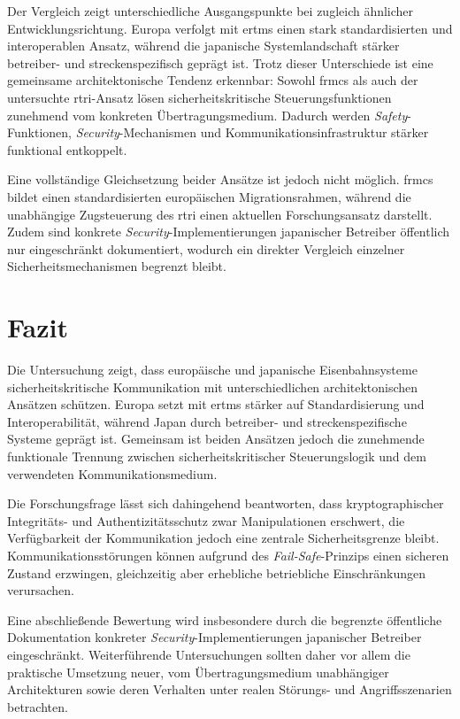 \documentclass[runningheads]{res/llncs}
\begin{document}
Der Vergleich zeigt unterschiedliche Ausgangspunkte bei zugleich ähnlicher Entwicklungsrichtung. Europa verfolgt mit \gls{ertms} einen stark standardisierten und interoperablen Ansatz, während die japanische Systemlandschaft stärker betreiber- und streckenspezifisch geprägt ist. Trotz dieser Unterschiede ist eine gemeinsame architektonische Tendenz erkennbar: Sowohl \gls{frmcs} als auch der untersuchte \gls{rtri}-Ansatz lösen sicherheitskritische Steuerungsfunktionen zunehmend vom konkreten Übertragungsmedium. Dadurch werden \textit{Safety}-Funktionen, \textit{Security}-Mechanismen und Kommunikationsinfrastruktur stärker funktional entkoppelt.

Eine vollständige Gleichsetzung beider Ansätze ist jedoch nicht möglich. \gls{frmcs} bildet einen standardisierten europäischen Migrationsrahmen, während die unabhängige Zugsteuerung des \gls{rtri} einen aktuellen Forschungsansatz darstellt. Zudem sind konkrete \textit{Security}-Implementierungen japanischer Betreiber öffentlich nur eingeschränkt dokumentiert, wodurch ein direkter Vergleich einzelner Sicherheitsmechanismen begrenzt bleibt.

\section{Fazit}
\label{sec:Fazit}

Die Untersuchung zeigt, dass europäische und japanische Eisenbahnsysteme sicherheitskritische Kommunikation mit unterschiedlichen architektonischen Ansätzen schützen. Europa setzt mit \gls{ertms} stärker auf Standardisierung und Interoperabilität, während Japan durch betreiber- und streckenspezifische Systeme geprägt ist. Gemeinsam ist beiden Ansätzen jedoch die zunehmende funktionale Trennung zwischen sicherheitskritischer Steuerungslogik und dem verwendeten Kommunikationsmedium.

Die Forschungsfrage lässt sich dahingehend beantworten, dass kryptographischer Integritäts- und Authentizitätsschutz zwar Manipulationen erschwert, die Verfügbarkeit der Kommunikation jedoch eine zentrale Sicherheitsgrenze bleibt. Kommunikationsstörungen können aufgrund des \textit{Fail-Safe}-Prinzips einen sicheren Zustand erzwingen, gleichzeitig aber erhebliche betriebliche Einschränkungen verursachen.

Eine abschließende Bewertung wird insbesondere durch die begrenzte öffentliche Dokumentation konkreter \textit{Security}-Implementierungen japanischer Betreiber eingeschränkt. Weiterführende Untersuchungen sollten daher vor allem die praktische Umsetzung neuer, vom Übertragungsmedium unabhängiger Architekturen sowie deren Verhalten unter realen Störungs- und Angriffsszenarien betrachten.

\newpage



\newpage
\printbibliography

% 
% 
\end{document}
